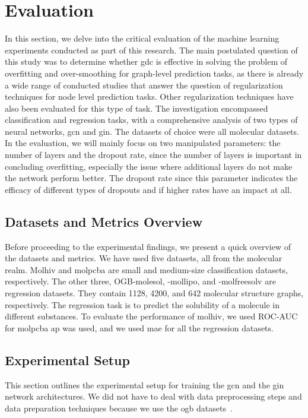%
\chapter{Evaluation}
\label{sec:eval}
In this section, we delve into the critical evaluation of the machine learning experiments conducted as part of this research.
The main postulated question of this study was to determine whether \ac{gdc} is effective in solving the problem of overfitting and over-smoothing for graph-level prediction tasks, as there is already a wide range of conducted studies that answer the question of regularization techniques for node level prediction tasks.
Other regularization techniques have also been evaluated for this type of task.
The investigation encompassed classification and regression tasks, with a comprehensive analysis of two types of neural networks, \ac{gcn} and \ac{gin}.
The datasets of choice were all molecular datasets.
In the evaluation, we will mainly focus on two manipulated parameters: the number of layers and the dropout rate, since the number of layers is important in concluding overfitting, especially the issue where additional layers do not make the network perform better.
The dropout rate since this parameter indicates the efficacy of different types of dropouts and if higher rates have an impact at all.

\section{Datasets and Metrics Overview}
\label{sec:eval:overvies}

Before proceeding to the experimental findings, we present a quick overview of the datasets and metrics.
We have used five datasets, all from the molecular realm.
Molhiv and molpcba are small and medium-size classification datasets, respectively.
The other three, OGB-molesol, -mollipo, and -molfreesolv are regression datasets.
They contain 1128, 4200, and 642 molecular structure graphs, respectively.
The regression task is to predict the solubility of a molecule in different substances.
To evaluate the performance of molhiv, we used ROC-AUC for molpcba \ac{ap} was used, and we used \ac{mae} for all the regression datasets.

\section{Experimental Setup}
\label{sec:eval:setup}
This section outlines the experimental setup for training the \ac{gcn} and the \ac{gin} network architectures.
We did not have to deal with data preprocessing steps and data preparation techniques because we use the \ac{ogb} datasets~\cite{Hu2020}.

